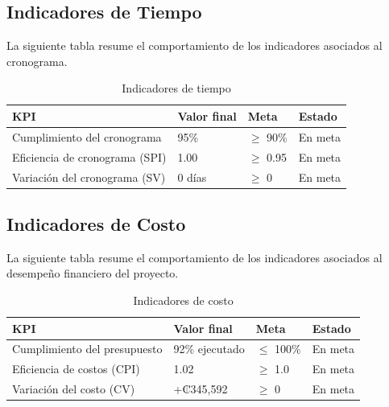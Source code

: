 \documentclass[11pt,spanish]{article}
\begin{document}
\subsection{Indicadores de Tiempo}

La siguiente tabla resume el comportamiento de los indicadores asociados al
cronograma.

\begin{table}[H]
\centering
\caption{Indicadores de tiempo}
\label{tab:kpi-tiempo}
\begin{tabularx}{\textwidth}{Yp{3cm}p{2.5cm}p{2.5cm}}
\toprule
\textbf{KPI} &
\textbf{Valor final} &
\textbf{Meta} &
\textbf{Estado} \\
\midrule

Cumplimiento del cronograma &
95\% &
$\geq$ 90\% &
En meta
\\

Eficiencia de cronograma (SPI) &
1.00 &
$\geq$ 0.95 &
En meta
\\

Variación del cronograma (SV) &
0 días &
$\geq$ 0 &
En meta
\\

\bottomrule
\end{tabularx}
\end{table}

\subsection{Indicadores de Costo}

La siguiente tabla resume el comportamiento de los indicadores asociados al
desempeño financiero del proyecto.

\begin{table}[H]
\centering
\caption{Indicadores de costo}
\label{tab:kpi-costo}
\begin{tabularx}{\textwidth}{Yp{3cm}p{2.5cm}p{2.5cm}}
\toprule
\textbf{KPI} &
\textbf{Valor final} &
\textbf{Meta} &
\textbf{Estado} \\
\midrule

Cumplimiento del presupuesto &
92\% ejecutado &
$\leq$ 100\% &
En meta
\\

Eficiencia de costos (CPI) &
1.02 &
$\geq$ 1.0 &
En meta
\\

Variación del costo (CV) &
+₡345,592 &
$\geq$ 0 &
En meta
\\

\bottomrule
\end{tabularx}
\end{table}
\end{document}
